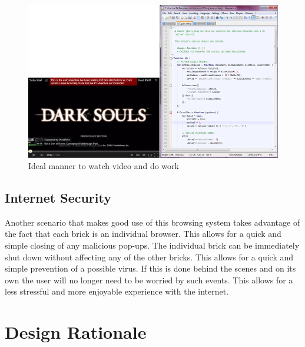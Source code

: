 \documentclass[11pt]{article}
\begin{document}
\begin{figure}[h!]
 \centering
    \includegraphics[width= 1\textwidth]{./Images/YoutubeWorkClean}
  \caption{Ideal manner to watch video and do work}
 \label{YouWorkClean}
\end{figure}

\subsection{Internet Security}
Another scenario that makes good use of this browsing system takes advantage of the fact that each brick is an individual browser. This allows for a quick and simple closing of any malicious pop-ups. The individual brick can be immediately shut down without affecting any of the other bricks. This allows for a quick and simple prevention of a possible virus. If this is done behind the scenes and on its own the user will no longer need to be worried by such events. This allows for a less stressful and more enjoyable experience with the internet.

\section{Design Rationale}
\end{document}
